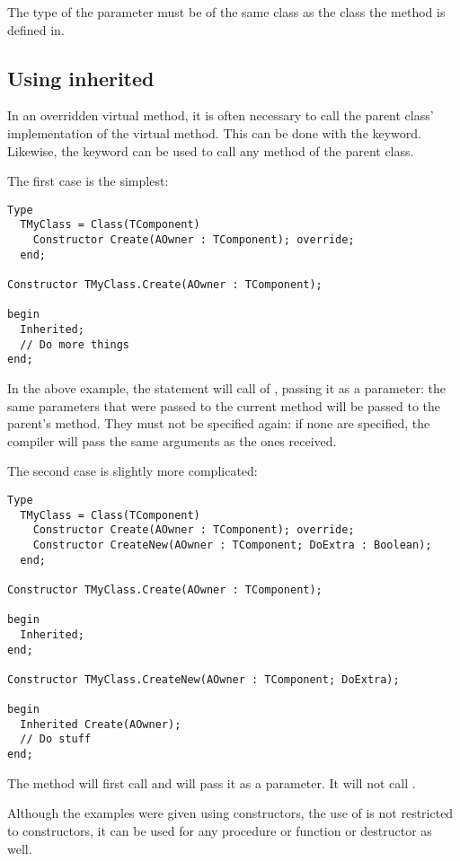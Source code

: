 \begin{remark}
The type of the  parameter must be of the same class
as the class the method is defined in.
\end{remark}

\subsection{Using inherited}
In an overridden virtual method, it is often necessary to call the parent
class' implementation of the virtual method. This can be  done with the
 keyword. Likewise, the  keyword can be used
to call any method of the parent class.

The first case is the simplest:
\begin{verbatim}
Type
  TMyClass = Class(TComponent)
    Constructor Create(AOwner : TComponent); override;
  end;

Constructor TMyClass.Create(AOwner : TComponent); 

begin
  Inherited;
  // Do more things
end;
\end{verbatim}
In the above example, the  statement will call 
of , passing it  as a parameter: the same
parameters that were passed to the current method will be passed to the
parent's method. They must not be specified again: if none are specified,
the compiler will pass the same arguments as the ones received.

The second case is slightly more complicated:
\begin{verbatim}
Type
  TMyClass = Class(TComponent)
    Constructor Create(AOwner : TComponent); override;
    Constructor CreateNew(AOwner : TComponent; DoExtra : Boolean);
  end;

Constructor TMyClass.Create(AOwner : TComponent); 

begin
  Inherited;
end;

Constructor TMyClass.CreateNew(AOwner : TComponent; DoExtra); 

begin
  Inherited Create(AOwner);
  // Do stuff
end;
\end{verbatim}
The  method will first call  and
will pass it  as a parameter. It will not call
.

Although the examples were given using constructors, the use of
 is not restricted to constructors, it can be used
for any procedure or function or destructor as well.

